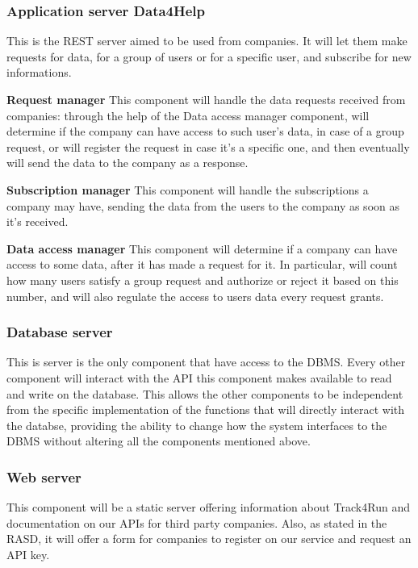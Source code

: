 \documentclass[../main.tex]{subfiles}
\begin{document}
\subsubsection{Application server Data4Help} This is the REST server aimed to be used from companies. It will let them make requests for data, for a group of users or for a specific user, and subscribe for new informations.

\begin{description}

	\item{\bf Request manager} This component will handle the data requests received from companies: through the help of the Data access manager component, will determine if the company can have access to such user's data, in case of a group request, or will register the request in case it's a specific one, and then eventually will send the data to the company as a response.

	\item{\bf Subscription manager} This component will handle the subscriptions a company may have, sending the data from the users to the company as soon as it's received.

	\item{\bf Data access manager} This component will determine if a company can have access to some data, after it has made a request for it. In particular, will count how many users satisfy a group request and authorize or reject it based on this number, and will also regulate the access to users data every request grants.

\end{description}

\subsubsection{Database server} This is server is the only component that have access to the DBMS. Every other component will interact with the API this component makes available to read and write on the database. This allows the other components to be independent from the specific implementation of the functions that will directly interact with the databse, providing the ability to change how the system interfaces to the DBMS without altering all the components mentioned above.

\subsubsection{Web server} This component will be a static server offering information about Track4Run and documentation on our APIs for third party companies. Also, as stated in the RASD, it will offer a form for companies to register on our service and request an API key.
\end{document}
